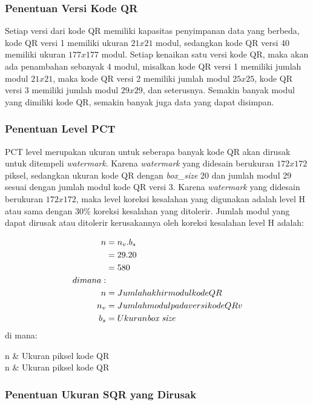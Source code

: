 \subsubsection{Penentuan Versi Kode QR}
Setiap versi dari kode QR memiliki kapasitas penyimpanan data yang berbeda, kode QR versi 1 memiliki ukuran $21x21$ modul, sedangkan kode QR versi 40 memiliki
ukuran $177x177$ modul. Setiap kenaikan satu versi kode QR, maka akan ada penambahan sebanyak 4 modul, misalkan kode QR versi 1 memiliki jumlah modul $21x21$,
maka kode QR versi 2 memiliki jumlah modul $25x25$, kode QR versi 3 memiliki jumlah modul $29x29$, dan seterusnya. Semakin banyak modul yang dimiliki kode QR,
semakin banyak juga data yang dapat disimpan.

\subsubsection{Penentuan Level PCT}
PCT level merupakan ukuran untuk seberapa banyak kode QR akan dirusak untuk ditempeli \emph{watermark}. Karena \emph{watermark} yang didesain berukuran
$172x172$ piksel, sedangkan ukuran kode QR dengan \emph{box\_size} 20 dan jumlah modul 29 sesuai dengan jumlah modul kode QR versi 3. Karena \emph{watermark}
yang didesain berukuran $172x172$, maka level koreksi kesalahan yang digunakan adalah level H atau sama dengan 30\% koreksi kesalahan yang ditolerir. Jumlah
modul yang dapat dirusak atau ditolerir kerusakannya oleh koreksi kesalahan level H adalah:

\begin{align}
	n & = n_v.b_s \\&=29.20\nonumber\\&=580\nonumber\\di mana:\\n &= Jumlah akhir modul kode QR\\n_v &= Jumlah modul pada versi kode QR v\\b_s &= Ukuran \emph{box size}
\end{align}
di mana:

\begin{conditions*}
	n & Ukuran piksel kode QR\\
	n & Ukuran piksel kode QR
\end{conditions*}

\subsubsection{Penentuan Ukuran SQR yang Dirusak}

